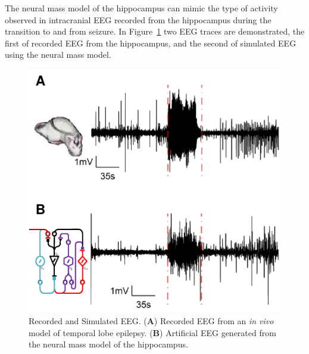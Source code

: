 \documentclass[10pt]{article}%
\begin{document}
The neural mass model of the hippocampus can mimic the type of activity observed in intracranial EEG recorded from the hippocampus during the transition to and from seizure. In Figure~\ref{fig: EEG} two EEG traces are demonstrated, the first of recorded EEG from the hippocampus, and the second of simulated EEG using the neural mass model.

\begin{figure}
 	\centering
 		\includegraphics{fig/EEG.pdf}
 	\caption{Recorded and Simulated EEG. (\textbf{A}) Recorded EEG from an \textsl{in vivo} model of temporal lobe epilepsy. (\textbf{B}) Artificial EEG generated from the neural mass model of the hippocampus.}
 	\label{fig: EEG}
 \end{figure}
\end{document}
